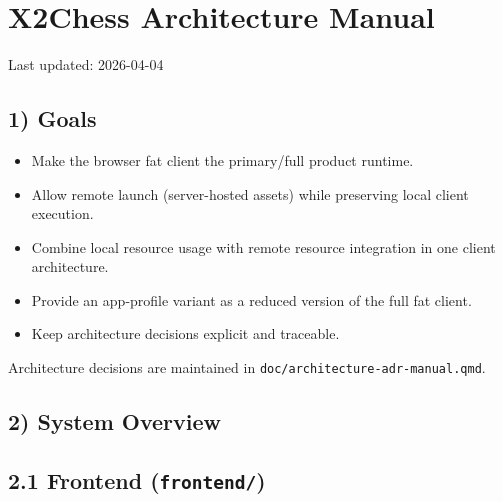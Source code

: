 \documentclass[]{article}
\author{}
\date{\vspace{-2.5em}}
\providecommand{\tightlist}{%
  \setlength{\itemsep}{0pt}\setlength{\parskip}{0pt}}
\begin{document}
\section{X2Chess Architecture Manual}\label{x2chess-architecture-manual}

Last updated: 2026-04-04

\subsection{1) Goals}\label{goals}

\begin{itemize}
\tightlist
\item
  Make the browser fat client the primary/full product runtime.
\item
  Allow remote launch (server-hosted assets) while preserving local
  client execution.
\item
  Combine local resource usage with remote resource integration in one
  client architecture.
\item
  Provide an app-profile variant as a reduced version of the full fat
  client.
\item
  Keep architecture decisions explicit and traceable.
\end{itemize}

Architecture decisions are maintained in
\texttt{doc/architecture-adr-manual.qmd}.

\subsection{2) System Overview}\label{system-overview}

\subsection{\texorpdfstring{2.1 Frontend
(\texttt{frontend/})}{2.1 Frontend (frontend/)}}\label{frontend-frontend}
\end{document}
